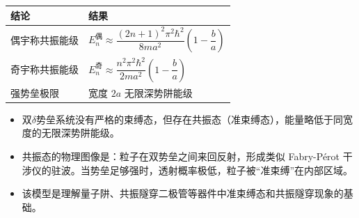 \begin{formulabox}[答案汇总]
\begin{center}
\begin{tabular}{ll}
\toprule
\textbf{结论} & \textbf{结果} \\
\midrule
偶宇称共振能级 & $E_n^{\text{偶}}\approx\dfrac{(2n+1)^2\pi^2\hbar^2}{8ma^2}\left(1-\dfrac{b}{a}\right)$ \\
奇宇称共振能级 & $E_n^{\text{奇}}\approx\dfrac{n^2\pi^2\hbar^2}{2ma^2}\left(1-\dfrac{b}{a}\right)$ \\
强势垒极限 & 宽度 $2a$ 无限深势阱能级 \\
\bottomrule
\end{tabular}
\end{center}
\end{formulabox}

\begin{insightbox}[物理图像]
\begin{itemize}
    \item 双$\delta$势垒系统没有严格的束缚态，但存在共振态（准束缚态），能量略低于同宽度的无限深势阱能级。
    \item 共振态的物理图像是：粒子在双势垒之间来回反射，形成类似 Fabry-Pérot 干涉仪的驻波。当势垒足够强时，透射概率极低，粒子被``准束缚''在内部区域。
    \item 该模型是理解量子阱、共振隧穿二极管等器件中准束缚态和共振隧穿现象的基础。
\end{itemize}
\end{insightbox}
